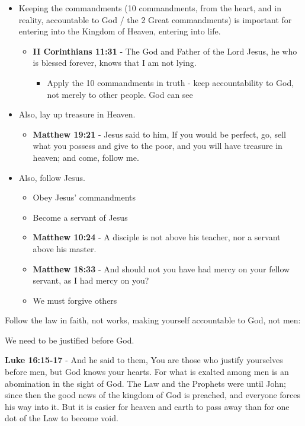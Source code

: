 \documentclass[11pt]{article}
\begin{document}
\begin{itemize}
\item Keeping the commandments (10 commandments, from the heart, and in reality, accountable to God / the 2 Great commandments) is important for entering into the Kingdom of Heaven, entering into life.
\begin{itemize}
\item \textbf{II Corinthians 11:31} - The God and Father of the Lord Jesus, he who is blessed forever, knows that I am not lying.
\begin{itemize}
\item Apply the 10 commandments in truth - keep accountability to God, not merely to other people. God can see
\end{itemize}
\end{itemize}
\item Also, lay up treasure in Heaven.
\begin{itemize}
\item \textbf{Matthew 19:21} - Jesus said to him, If you would be perfect, go, sell what you possess and give to the poor, and you will have treasure in heaven; and come, follow me.
\end{itemize}
\item Also, follow Jesus.
\begin{itemize}
\item Obey Jesus' commandments
\item Become a servant of Jesus
\item \textbf{Matthew 10:24} - A disciple is not above his teacher, nor a servant above his master.
\item \textbf{Matthew 18:33} - And should not you have had mercy on your fellow servant, as I had mercy on you?
\item We must forgive others
\end{itemize}
\end{itemize}

Follow the law in faith, not works, making yourself accountable to God, not men:

We need to be justified before God.

\textbf{Luke 16:15-17} - And he said to them, You are those who justify yourselves before men, but God knows your hearts. For what is exalted among men is an abomination in the sight of God.  The Law and the Prophets were until John; since then the good news of the kingdom of God is preached, and everyone forces his way into it.  But it is easier for heaven and earth to pass away than for one dot of the Law to become void.
\end{document}
